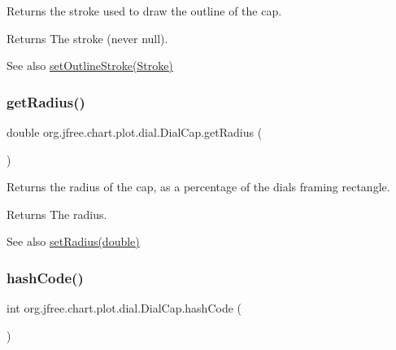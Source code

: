 Returns the stroke used to draw the outline of the cap.

\begin{DoxyReturn}{Returns}
The stroke (never {\ttfamily null}).
\end{DoxyReturn}
\begin{DoxySeeAlso}{See also}
\mbox{\hyperlink{classorg_1_1jfree_1_1chart_1_1plot_1_1dial_1_1_dial_cap_a1e220f1d41c509b7be9708871e0d3078}{set\+Outline\+Stroke(\+Stroke)}} 
\end{DoxySeeAlso}
\mbox{\label{classorg_1_1jfree_1_1chart_1_1plot_1_1dial_1_1_dial_cap_ad9d82886f81da0f1e38a92e2d6f6b41d}} 
\subsubsection{\texorpdfstring{get\+Radius()}{getRadius()}}
{\footnotesize\ttfamily double org.\+jfree.\+chart.\+plot.\+dial.\+Dial\+Cap.\+get\+Radius (\begin{DoxyParamCaption}{ }\end{DoxyParamCaption})}

Returns the radius of the cap, as a percentage of the dial\textquotesingle{}s framing rectangle.

\begin{DoxyReturn}{Returns}
The radius.
\end{DoxyReturn}
\begin{DoxySeeAlso}{See also}
\mbox{\hyperlink{classorg_1_1jfree_1_1chart_1_1plot_1_1dial_1_1_dial_cap_ad614d37cf451d4909c1a4de4ba2da69e}{set\+Radius(double)}} 
\end{DoxySeeAlso}
\mbox{\label{classorg_1_1jfree_1_1chart_1_1plot_1_1dial_1_1_dial_cap_ae1a81078f7e377e25331504c25099612}} 
\subsubsection{\texorpdfstring{hash\+Code()}{hashCode()}}
{\footnotesize\ttfamily int org.\+jfree.\+chart.\+plot.\+dial.\+Dial\+Cap.\+hash\+Code (\begin{DoxyParamCaption}{ }\end{DoxyParamCaption})}


